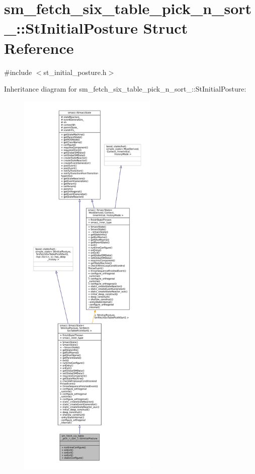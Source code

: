 \hypertarget{structsm__fetch__six__table__pick__n__sort__1_1_1StInitialPosture}{}\section{sm\+\_\+fetch\+\_\+six\+\_\+table\+\_\+pick\+\_\+n\+\_\+sort\+\_\+:\+:St\+Initial\+Posture Struct Reference}
\label{structsm__fetch__six__table__pick__n__sort__1_1_1StInitialPosture}


{\ttfamily \#include $<$st\+\_\+initial\+\_\+posture.\+h$>$}



Inheritance diagram for sm\+\_\+fetch\+\_\+six\+\_\+table\+\_\+pick\+\_\+n\+\_\+sort\+\_\+:\+:St\+Initial\+Posture\+:
\nopagebreak
\begin{figure}[H]
\begin{center}
\leavevmode
\includegraphics[height=550pt]{structsm__fetch__six__table__pick__n__sort__1_1_1StInitialPosture__inherit__graph}
\end{center}
\end{figure}


